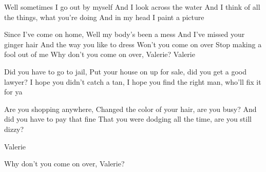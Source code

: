 \begin{bridge}
Well sometimes I go out by myself
And I look across the water
And I think of all the things,
what you're doing
And in my head I paint a picture
\end{bridge}

\begin{chorus}
Since I've come on home,
Well my body's been a mess
And I've missed your ginger hair
And the way you like to dress
Won't you come on over
Stop making a fool out of me
Why don't you come on over, Valerie?
Valerie 
\end{chorus}

\begin{verse*}
Did you have to go to jail,
Put your house on up for sale,
did you get a good lawyer?
I hope you didn't catch a tan,
I hope you find the right man,
who'll fix it for ya
\end{verse*}

\begin{verse*}
Are you shopping anywhere,
Changed the color of your hair,
are you busy?
And did you have to pay that fine
That you were dodging all the time,
are you still dizzy?
\end{verse*}

\thechorus
\thebridge
\thechorus

\begin{verse*}
Valerie 
\end{verse*}

\begin{verse*}
Why don't you come on over, Valerie?
\end{verse*}